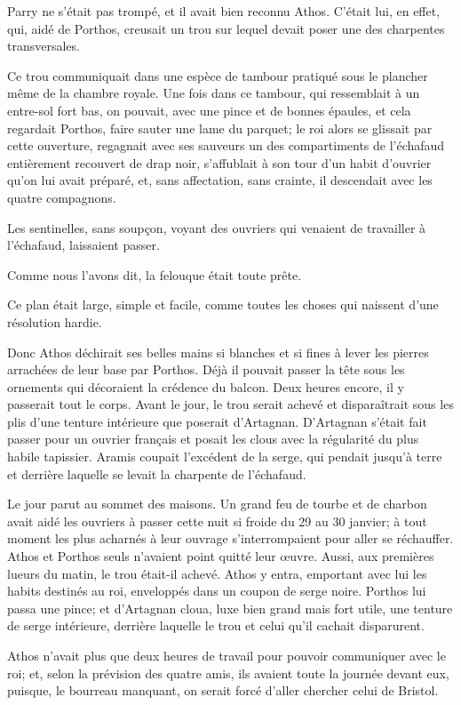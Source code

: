 Parry ne s'était pas trompé, et il avait bien reconnu Athos. C'était lui, en effet, qui, aidé de Porthos, creusait un trou sur lequel devait poser une des charpentes transversales.

Ce trou communiquait dans une espèce de tambour pratiqué sous le plancher même de la chambre royale. Une fois dans ce tambour, qui ressemblait à un entre-sol fort bas, on pouvait, avec une pince et de bonnes épaules, et cela regardait Porthos, faire sauter une lame du parquet; le roi alors se glissait par cette ouverture, regagnait avec ses sauveurs un des compartiments de l'échafaud entièrement recouvert de drap noir, s'affublait à son tour d'un habit d'ouvrier qu'on lui avait préparé, et, sans affectation, sans crainte, il descendait avec les quatre compagnons.

Les sentinelles, sans soupçon, voyant des ouvriers qui venaient de travailler à l'échafaud, laissaient passer.

Comme nous l'avons dit, la felouque était toute prête.

Ce plan était large, simple et facile, comme toutes les choses qui naissent d'une résolution hardie.

Donc Athos déchirait ses belles mains si blanches et si fines à lever les pierres arrachées de leur base par Porthos. Déjà il pouvait passer la tête sous les ornements qui décoraient la crédence du balcon. Deux heures encore, il y passerait tout le corps. Avant le jour, le trou serait achevé et disparaîtrait sous les plis d'une tenture intérieure que poserait d'Artagnan. D'Artagnan s'était fait passer pour un ouvrier français et posait les clous avec la régularité du plus habile tapissier. Aramis coupait l'excédent de la serge, qui pendait jusqu'à terre et derrière laquelle se levait la charpente de l'échafaud.

Le jour parut au sommet des maisons. Un grand feu de tourbe et de charbon avait aidé les ouvriers à passer cette nuit si froide du 29 au 30 janvier; à tout moment les plus acharnés à leur ouvrage s'interrompaient pour aller se réchauffer. Athos et Porthos seuls n'avaient point quitté leur œuvre. Aussi, aux premières lueurs du matin, le trou était-il achevé. Athos y entra, emportant avec lui les habits destinés au roi, enveloppés dans un coupon de serge noire. Porthos lui passa une pince; et d'Artagnan cloua, luxe bien grand mais fort utile, une tenture de serge intérieure, derrière laquelle le trou et celui qu'il cachait disparurent.

Athos n'avait plus que deux heures de travail pour pouvoir communiquer avec le roi; et, selon la prévision des quatre amis, ils avaient toute la journée devant eux, puisque, le bourreau manquant, on serait forcé d'aller chercher celui de Bristol.

